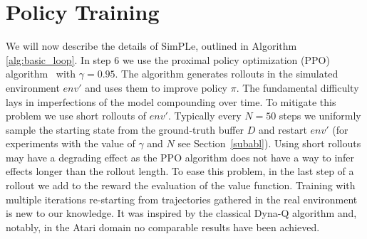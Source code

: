 \section{Policy Training} \label{sec:policy_training}



We will now describe the details of SimPLe, outlined in Algorithm \ref{alg:basic_loop}.  In step 6 we use the proximal policy optimization (PPO) algorithm~\citep{ppo} with $\gamma=0.95$. The algorithm generates rollouts in the simulated environment $env'$ and uses them to improve policy $\pi$. The fundamental difficulty lays in imperfections of the model compounding over time. To mitigate this problem we use short rollouts of $env'$. Typically every $N=50$ steps we uniformly sample the starting state from the ground-truth buffer $D$ and restart $env'$ (for experiments with the value
of $\gamma$ and $N$ see Section~\ref{subabl}). Using short rollouts may have a degrading effect as the PPO algorithm does not have a way to infer effects longer than the rollout length. To ease this problem, in the last step of a rollout we add to the reward the evaluation of the value function.
Training with multiple iterations re-starting from trajectories gathered in the real environment is  new to our knowledge. It was inspired by the classical Dyna-Q algorithm and, notably, in the Atari domain no comparable results have been achieved.


